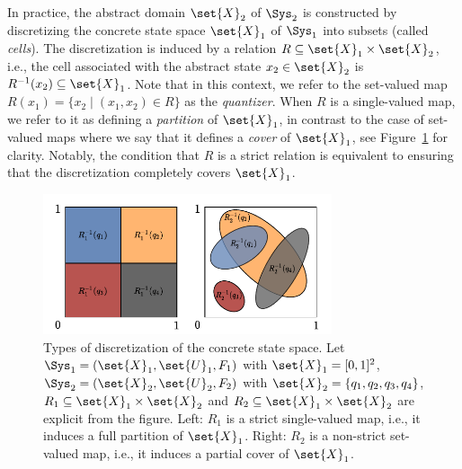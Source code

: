 \documentclass{juliacon}
\begin{document}
\vskip 6pt
In practice, the abstract domain $\set{X}_2$ of $\Sys_2$ is constructed by discretizing the concrete state space $\set{X}_1$ of $\Sys_1$ into subsets (called \emph{cells}). The discretization is induced by a relation $R\subseteq \set{X}_1\times \set{X}_2$, i.e., the cell associated with the abstract state $x_2\in\set{X}_2$ is $R^{-1}(x_2)\subseteq \set{X}_1$.
Note that in this context, we refer to the set-valued map $R(x_1) = \{x_2 \mid (x_1, x_2)\in R\}$ as the \emph{quantizer}.
When $R$ is a single-valued map, we refer to it as defining a \emph{partition} of $\set{X}_1$, in contrast to the case of set-valued maps where we say that it defines a \emph{cover} of $\set{X}_1$, see Figure~\ref{fig:discretization} for clarity.
Notably, the condition that $R$ is a strict relation is equivalent to ensuring that the discretization completely covers $\set{X}_1$.

\begin{figure}[ht!]
\centerline{\includegraphics[width=8.5cm]{Figures/Abstraction/strict-cover-partition.pdf}}
\caption{
    Types of discretization of the concrete state space.
    Let $\Sys_{1} = (\set{X}_1,\set{U}_1,F_1)$ with $\set{X}_1 = [0,1]^2$, $\Sys_{2} = (\set{X}_2,\set{U}_2,F_2)$ with $\set{X}_2 = \{q_1,q_2,q_3,q_4\}$, $R_1 \subseteq \set{X}_1\times \set{X}_2$ and $R_2 \subseteq \set{X}_1\times \set{X}_2$ are explicit from the figure.
    Left: $R_1$ is a strict single-valued map, i.e., it induces a full partition of $\set{X}_1$. Right: $R_2$ is a non-strict set-valued map, i.e., it induces a partial cover of $\set{X}_1$.
    }
    \label{fig:discretization}
\end{figure}

\vskip 6pt
\end{document}
